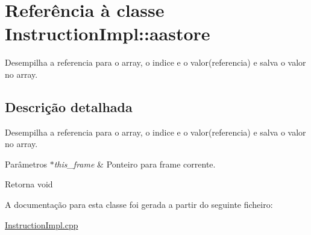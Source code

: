 \hypertarget{class_instruction_impl_1_1aastore}{}\section{Referência à classe Instruction\+Impl\+:\+:aastore}
\label{class_instruction_impl_1_1aastore}


Desempilha a referencia para o array, o indice e o valor(referencia) e salva o valor no array.  




\subsection{Descrição detalhada}
Desempilha a referencia para o array, o indice e o valor(referencia) e salva o valor no array. 


\begin{DoxyParams}{Parâmetros}
{\em $\ast$this\+\_\+frame} & Ponteiro para frame corrente. \\
\hline
\end{DoxyParams}
\begin{DoxyReturn}{Retorna}
void 
\end{DoxyReturn}


A documentação para esta classe foi gerada a partir do seguinte ficheiro\+:\begin{DoxyCompactItemize}
\item 
\hyperlink{_instruction_impl_8cpp}{Instruction\+Impl.\+cpp}\end{DoxyCompactItemize}
